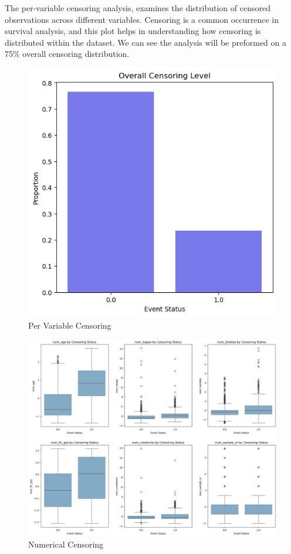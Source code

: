 \clearpage
\noindent  The per-variable censoring analysis, examines the distribution of censored observations across different variables. Censoring is a common occurrence in survival analysis, and this plot helps in understanding how censoring is distributed within the dataset. We can see the analysis will be preformed on a 75\% overall censoring distribution.
\begin{figure}[h]
    \centering
    \includegraphics[scale=0.33]{Figures/EDA/censor_over.png}
    \caption{Per Variable Censoring}
    \label{fig:your_label}
\end{figure}

\begin{figure}[h]
    \centering
    \includegraphics[scale=0.32]{Figures/EDA/censor.png}
    \caption{Numerical Censoring}
    \label{fig:your_label}
\end{figure}
\clearpage


